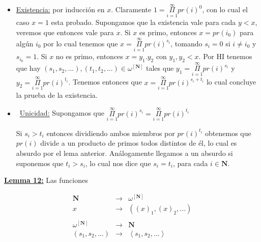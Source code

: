   \PROOF

    \begin{itemize}
      \item \underline{Existencia:} por inducción en $x$. Claramente
        $1 =\underset{i=1}{\overset{\infty}{\Pi}} pr(i)^{0}$, con lo cual el caso $x=1$ esta probado. Supongamos que la
        existencia vale para cada $y < x$, veremos que entonces vale para $x$. Si $x$ es primo, entonces $x=pr(i_{0})$
        para algún $i_{0}$ por lo cual tenemos que $x = \underset{i=1}{\overset{\infty}{\Pi}} pr(i)^{s_{i}}$, tomando
        $s_{i} = 0$ si $i \neq i_{0}$ y $s_{i_{0}} = 1$. Si $x$ no es primo, entonces $x = y_{1} . y_{2}$ con
        $y_{1}, y_{2} < x$. Por HI tenemos que hay
        $(s_{1}, s_{2}, ...), (t_{1}, t_{2}, ...) \in \omega^{\left[\mathbf{N}\right]}$ tales que
        $y_{1} = \underset{i=1}{\overset{\infty}{\Pi}} pr(i)^{s_{i}}$ y
        $y_{2} = \underset{i=1}{\overset{\infty}{\Pi}} pr(i)^{t_{i}}$. Tenemos entonces que
        $x=\underset{i=1}{\overset{\infty}{\Pi}} pr(i)^{s_{i} + t_{i}}$ lo cual concluye la prueba de la existencia.

      \item \underline{Unicidad:} Supongamos que
        $\underset{i=1}{\overset{\infty}{\Pi}} pr(i)^{s_{i}} = \underset{i=1}{\overset{\infty}{\Pi}} pr(i)^{t_{i}}$

        \par Si $s_{i} > t_{i}$ entonces dividiendo ambos miembros por $pr(i)^{t_{i}}$ obtenemos que $pr(i)$ divide a
        un producto de primos todos distintos de él, lo cual es absurdo por el lema anterior. Análogamente llegamos a
        un absurdo si suponemos que $t_{i} > s_{i}$, lo cual nos dice que $s_{i} = t_{i}$, para cada
        $i \in \mathbf{N}$.
    \end{itemize}

  \QED


  \textbf{\underline{Lemma 12:}} Las funciones

    \begin{eqnarray}
    	\nonumber \mathbf{N} &\rightarrow& \omega^{\left[\mathbf{N}\right]} \\
    	\nonumber x &\rightarrow& ((x)_{1}, (x)_{2}, ...) \\
      \nonumber \\
      \nonumber \omega^{\left[\mathbf{N}\right]} &\rightarrow& \mathbf{N} \\
      \nonumber (s_{1}, s_{2}, ...) &\rightarrow& \left\langle s_{1}, s_{2}, ... \right\rangle
  	\end{eqnarray}

